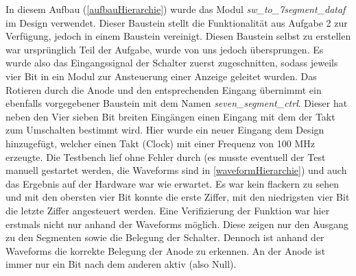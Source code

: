 \documentclass[11pt, a4paper]{article}
\begin{document}
In diesem Aufbau (\autoref{aufbauHierarchie}) wurde das Modul \textit{sw\_to\_7segment\_dataf} im Design verwendet. Dieser Baustein stellt die Funktionalität aus Aufgabe 2 zur Verfügung, jedoch in einem Baustein vereinigt. Diesen Baustein selbst zu erstellen war ursprünglich Teil der Aufgabe, wurde von uns jedoch übersprungen. Es wurde also das Eingangssignal der Schalter zuerst zugeschnitten, sodass jeweils vier Bit in ein Modul zur Ansteuerung einer Anzeige geleitet wurden. Das Rotieren durch die Anode und den entsprechenden Eingang übernimmt ein ebenfalls vorgegebener Baustein mit dem Namen \textit{seven\_segment\_ctrl}. Dieser hat neben den Vier sieben Bit breiten Eingängen einen Eingang mit dem der Takt zum Umschalten bestimmt wird. Hier wurde ein neuer Eingang dem Design hinzugefügt, welcher einen Takt (Clock) mit einer Frequenz von 100 MHz erzeugte.
Die Testbench lief ohne Fehler durch (es musste eventuell der Test manuell gestartet werden, die Waveforms sind in \autoref{waveformHierarchie}) und auch das Ergebnis auf der Hardware war wie erwartet. Es war kein flackern zu sehen und mit den obersten vier Bit konnte die erste Ziffer, mit den niedrigsten vier Bit die letzte Ziffer angesteuert werden. Eine Verifizierung der Funktion war hier erstmals nicht nur anhand der Waveforms möglich. Diese zeigen nur den Ausgang zu den Segmenten sowie die Belegung der Schalter. Dennoch ist anhand der Waveforms die korrekte Belegung der Anode zu erkennen. An der Anode ist immer nur ein Bit nach dem anderen aktiv (also Null).

\newpage
\end{document}
